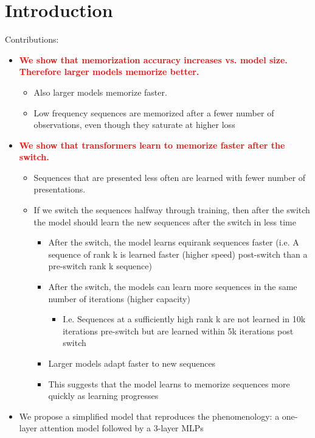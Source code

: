 \documentclass{article}
\theoremstyle{plain}
\theoremstyle{definition}
\theoremstyle{remark}
\begin{document}
\section{Introduction}
 

Contributions:
\begin{itemize}
    \item \textcolor{red}{\textbf{We show that memorization accuracy increases vs. model size. Therefore larger models memorize better.}}
    \begin{itemize}
        \item Also larger models memorize faster.
        \item Low frequency sequences are memorized after a fewer number of observations, even though they saturate at higher loss 
    \end{itemize}
    \item \textcolor{red}{\textbf{We show that transformers learn to memorize faster after the switch.}}
    \begin{itemize}
        \item Sequences that are presented less often are learned with fewer number of presentations.
        \item  If we switch the sequences halfway through training, then after the switch the model should learn the new sequences after the switch in less time
        \begin{itemize}
            \item After the switch, the model learns equirank sequences faster (i.e. A sequence of rank k is learned faster (higher speed) post-switch than a pre-switch rank k sequence)
            \item  After the switch, the models can learn more sequences in the same number of iterations (higher capacity)
            \begin{itemize}
                \item I.e. Sequences at a sufficiently high rank k are not learned in 10k iterations pre-switch but are learned within 5k iterations post switch
            \end{itemize}
            \item Larger models adapt faster to new sequences
        \item This suggests that the model learns to memorize sequences more quickly as learning progresses
        \end{itemize}
    \end{itemize}
    \item We propose a simplified model that reproduces the phenomenology: a one-layer attention model followed by a 3-layer MLPs

\end{itemize}
\end{document}
